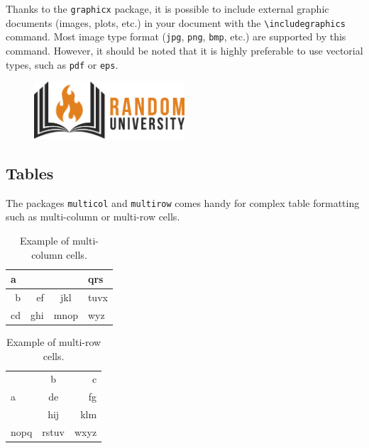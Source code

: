 \documentclass[a4paper, 12pt]{report}
\def\tbs{\textbackslash}
\begin{document}
    Thanks to the \texttt{graphicx} package, it is possible to include external graphic documents (images, plots, etc.) in your document with the \texttt{\tbs{}includegraphics} command. Most image type format (\texttt{jpg}, \texttt{png}, \texttt{bmp}, etc.) are supported by this command. However, it should be noted that it is highly preferable to use vectorial types, such as \texttt{pdf} or \texttt{eps}.

    \begin{figure}[H]
        \centering
        \includegraphics[width=0.5\textwidth]{resources/pdf/logo.pdf}
        \label{fig:random_university_logo}
    \end{figure}

    \subsection{Tables}

    The packages \texttt{multicol} and \texttt{multirow} comes handy for complex table formatting such as multi-column or multi-row cells.

    \begin{table}[H]
        \centering
        \begin{tabular}{|r|r|c|l|}
            \hline
            \multicolumn{3}{|l|}{a} & qrs  \\ \hline
             b &  ef &     jkl      & tuvx \\ \hline
            cd & ghi &     mnop     & wyz  \\ \hline
        \end{tabular}
        \caption{Example of multi-column cells.}
        \label{tab:multicol_example}
    \end{table}

    \begin{table}[H]
        \centering
        \begin{tabular}{|l|c|r|}
            \hline
            \multirow{3}{2cm}{a} &   b   &    c \\ \cline{2-3}
                                 &  de   &   fg \\ \cline{2-3}
                                 &  hij  &  klm \\ \hline
            nopq                 & rstuv & wxyz \\ \hline
        \end{tabular}
        \caption{Example of multi-row cells.}
        \label{tab:multirow_example}
    \end{table}
\end{document}
